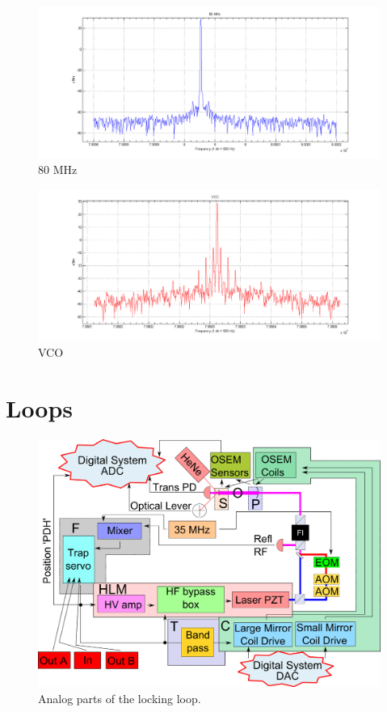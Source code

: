 \begin{figure}[htp]
	\centering
		\includegraphics[width=450pt]{figures/controls/80.png}
	\caption{80 MHz}
	\label{fig:80}
\end{figure}

\begin{figure}[htp]
	\centering
		\includegraphics[width=450pt]{figures/controls/VCO.png}
	\caption{VCO}
	\label{fig:VCO}
\end{figure}



\section{Loops}

\begin{figure}[htp]
\includegraphics[width=475pt,angle=270]{figures/controls/traplock.png}%
\caption{Analog parts of the locking loop.}%
\label{fig:traplock}%
\end{figure}

